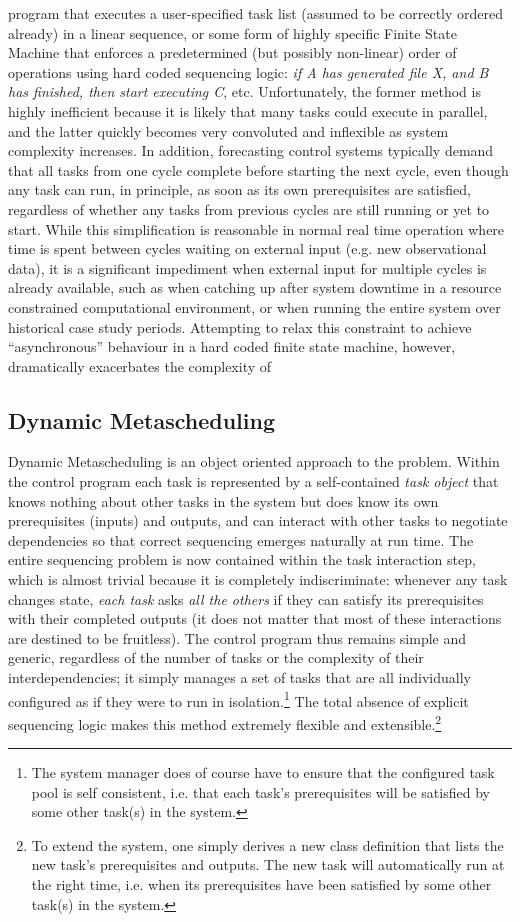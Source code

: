 \documentclass[11pt,a4paper]{article}
\begin{document}
program that executes a user-specified task list (assumed to be
correctly ordered already) in a linear sequence, or some form of highly
specific Finite State Machine that enforces a predetermined (but
possibly non-linear) order of operations using hard coded sequencing
logic: {\em if A has generated file X, and B has finished, then start
executing C}, etc. Unfortunately, the former method is highly
inefficient because it is likely that many tasks could execute in
parallel, and the latter quickly becomes very convoluted and inflexible
as system complexity increases. In addition, forecasting control systems
typically demand that all tasks from one cycle complete before starting
the next cycle, even though any task can run, in principle, as soon as
its own prerequisites are satisfied, regardless of whether any tasks
from previous cycles are still running or yet to start.  While this
simplification is reasonable in normal real time operation where time is
spent between cycles waiting on external input (e.g. new observational
data), it is a significant impediment when external input for multiple
cycles is already available, such as when catching up after system
downtime in a resource constrained computational environment, or when
running the entire system over historical case study periods.
Attempting to relax this constraint to achieve ``asynchronous''
behaviour in a hard coded finite state machine, however, dramatically
exacerbates the complexity of 


\subsection{Dynamic Metascheduling}

Dynamic Metascheduling is an object oriented approach to the problem.
Within the control program each task is represented by a self-contained
{\em task object} that knows nothing about other tasks in the system but
does know its own prerequisites (inputs) and outputs, and can interact
with other tasks to negotiate dependencies so that correct sequencing
emerges naturally at run time.  The entire sequencing problem is now
contained within the task interaction step, which is almost trivial
because it is completely indiscriminate: whenever any task changes
state, {\em each task} asks {\em all the others} if they can satisfy its
prerequisites with their completed outputs (it does not matter that most
of these interactions are destined to be fruitless). The control program
thus remains simple and generic, regardless of the number of tasks or
the complexity of their interdependencies; it simply manages a set of
tasks that are all individually configured as if they were to run in
isolation.\footnote{The system manager does of course have to ensure
that the configured task pool is self consistent, i.e. that each task's
prerequisites will be satisfied by some other task(s) in the system.}
The total absence of explicit sequencing logic makes this method
extremely flexible and extensible.\footnote{To extend the system, one
simply derives a new class definition that lists the new task's
prerequisites and outputs. The new task will automatically run at the
right time, i.e. when its prerequisites have been satisfied by some
other task(s) in the system.}
\end{document}
